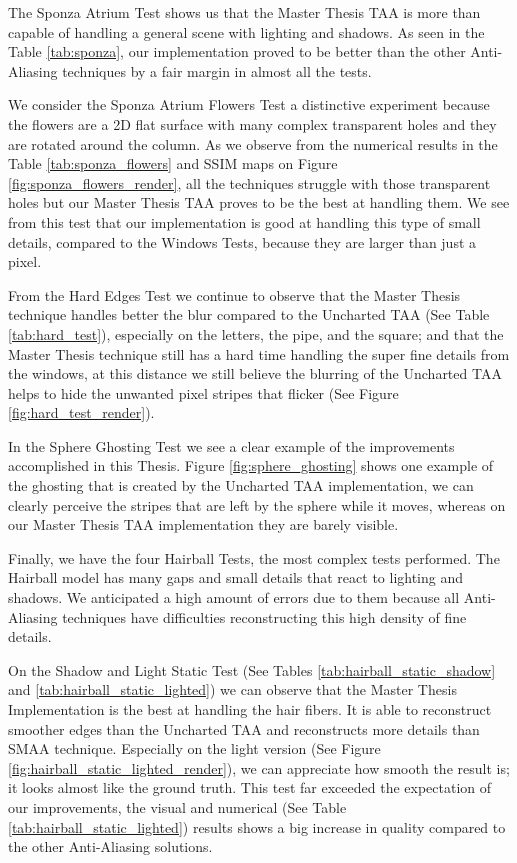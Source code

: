 \documentclass{cslthse-msc}
\begin{document}
The Sponza Atrium Test shows us that the Master Thesis TAA is more than capable of handling a general scene with lighting and shadows. As seen in the Table \ref{tab:sponza}, our implementation proved to be better than the other Anti-Aliasing techniques by a fair margin in almost all the tests.

We consider the Sponza Atrium Flowers Test a distinctive experiment because the flowers are a 2D flat surface with many complex transparent holes and they are rotated around the column. As we observe from the numerical results in the Table \ref{tab:sponza_flowers} and SSIM maps on Figure \ref{fig:sponza_flowers_render}, all the techniques struggle with those transparent holes but our Master Thesis TAA proves to be the best at handling them.  We see from this test that our implementation is good at handling this type of small details, compared to the Windows Tests, because they are larger than just a pixel. 

From the Hard Edges Test we continue to observe that the Master Thesis technique handles better the blur compared to the Uncharted TAA (See Table \ref{tab:hard_test}), especially on the letters, the pipe, and the square; and that the Master Thesis technique still has a hard time handling the super fine details from the windows, at this distance we still believe the blurring of the Uncharted TAA helps to hide the unwanted pixel stripes that flicker (See Figure \ref{fig:hard_test_render}).

In the Sphere Ghosting Test we see a clear example of the improvements accomplished in this Thesis. Figure \ref{fig:sphere_ghosting} shows one example of the ghosting that is created by the Uncharted TAA implementation, we can clearly perceive the stripes that are left by the sphere while it moves, whereas on our Master Thesis TAA implementation they are barely visible.

Finally, we have the four Hairball Tests, the most complex tests performed. The Hairball model has many gaps and small details that react to lighting and shadows. We anticipated a high amount of errors due to them because all Anti-Aliasing techniques have difficulties reconstructing this high density of fine details. 

On the Shadow and Light Static Test (See Tables \ref{tab:hairball_static_shadow} and \ref{tab:hairball_static_lighted}) we can observe that the Master Thesis Implementation is the best at handling the hair fibers. It is able to reconstruct smoother edges than the Uncharted TAA and reconstructs more details than SMAA technique. Especially on the light version (See Figure \ref{fig:hairball_static_lighted_render}), we can appreciate how smooth the result is; it looks almost like the ground truth. This test far exceeded the expectation of our improvements, the visual and numerical (See Table \ref{tab:hairball_static_lighted}) results shows a big increase in quality compared to the other Anti-Aliasing solutions.
\end{document}
